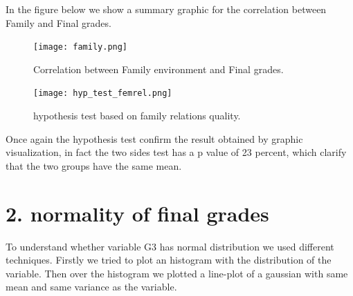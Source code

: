 \documentclass[a4paper, 11pt]{report}
\theoremstyle{definition}
\numberwithin{equation}{section}		%
\numberwithin{figure}{section}			%
\numberwithin{table}{section}				%
\begin{document}
\begin{itemize}
In the figure below we show a summary graphic for the correlation between Family and Final grades.
\begin{figure}[h]\centering
\texttt{[image: family.png]}
\caption{Correlation between Family environment and Final grades.}
\end{figure}

\begin{figure}[h]\centering
\texttt{[image: hyp\_test\_femrel.png]}
\caption{hypothesis test based on family relations quality.}
\end{figure}

Once again the hypothesis test confirm the result obtained by graphic visualization, in fact the two sides test has a p value of 23 percent, 
which clarify that the two groups have the same mean.

\end{itemize}




\section*{2. normality of final grades}

To understand whether variable G3 has normal distribution we used different
techniques. Firstly we tried to plot an histogram with the distribution of the variable. Then over the histogram we plotted a line-plot of a gaussian with same mean and same variance as the variable.
\end{document}

